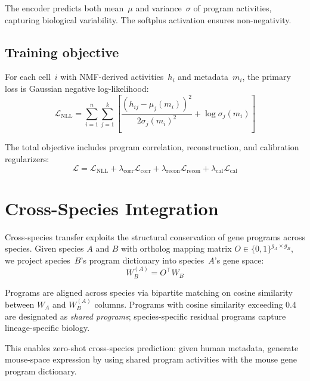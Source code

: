 \documentclass[10pt,twocolumn,letterpaper]{article}
\begin{document}
The encoder predicts both mean~$\mu$ and variance~$\sigma$ of program
activities, capturing biological variability. The softplus activation ensures
non-negativity.

\subsection{Training objective}
\label{sec:training}

For each cell~$i$ with NMF-derived activities~$h_i$ and metadata~$m_i$, the
primary loss is Gaussian negative log-likelihood:
\begin{equation}
  \mathcal{L}_{\text{NLL}} = \sum_{i=1}^{n} \sum_{j=1}^{k}
    \left[
      \frac{(h_{ij} - \mu_j(m_i))^2}{2\sigma_j(m_i)^2} + \log \sigma_j(m_i)
    \right]
  \label{eq:nll}
\end{equation}

The total objective includes program correlation, reconstruction, and
calibration regularizers:
\begin{equation}
  \mathcal{L} = \mathcal{L}_{\text{NLL}}
    + \lambda_{\text{corr}} \mathcal{L}_{\text{corr}}
    + \lambda_{\text{recon}} \mathcal{L}_{\text{recon}}
    + \lambda_{\text{cal}} \mathcal{L}_{\text{cal}}
  \label{eq:total-loss}
\end{equation}

\section{Cross-Species Integration}
\label{sec:cross-species}

Cross-species transfer exploits the structural conservation of gene programs
across species. Given species $A$ and $B$ with ortholog mapping matrix
$O \in \{0, 1\}^{g_A \times g_B}$, we project species~$B$'s program dictionary
into species~$A$'s gene space:
\begin{equation}
  W_B^{(A)} = O^\top W_B
  \label{eq:ortholog-projection}
\end{equation}

Programs are aligned across species via bipartite matching on cosine similarity
between $W_A$ and $W_B^{(A)}$ columns. Programs with cosine similarity exceeding
0.4 are designated as \emph{shared programs}; species-specific residual programs
capture lineage-specific biology.

This enables zero-shot cross-species prediction: given human metadata, generate
mouse-space expression by using shared program activities with the mouse gene
program dictionary.
\end{document}
